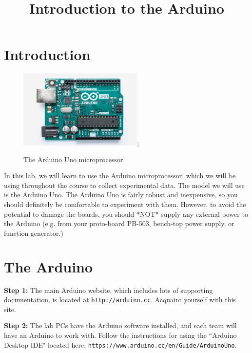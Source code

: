 \documentclass[12pt]{article}
\begin{document}

\title{Introduction to the Arduino} 

\maketitle

\section{Introduction}

\begin{figure}[htbp]
\begin{center}
 \includegraphics[width=0.55\textwidth]{figs/uno.jpg};
\caption{\label{fig:uno} The Arduino Uno microprocessor.}
\end{center}
\end{figure}

In this lab, we will learn to use the Arduino microprocessor, which we
will be using throughout the course to collect experimental data.  The model we will
use is the Arduino Uno.  The Arduino Uno is fairly robust and
inexpensive, so you should definitely be comfortable to experiment
with them.  However, to avoid the potential to damage the boards, you
should *NOT* supply any external power to the Arduino (e.g. from your
proto-board PB-503, bench-top power supply, or function generator.)

\section{The Arduino}

\noindent
{\bf Step 1:} The main Arduino website, which includes lots of
supporting documentation, is located at {\tt http://arduino.cc}.
Acquaint yourself with this site. 
\vspace{0.5 cm}

\noindent
{\bf Step 2:} The lab PCs have the Arduino software installed, and
each team will have an Arduino to work with.  Follow the instructions
for using the ``Arduino Desktop IDE" located here:  
{\tt https://www.arduino.cc/en/Guide/ArduinoUno}.
\vspace{0.5 cm}
\end{document}
